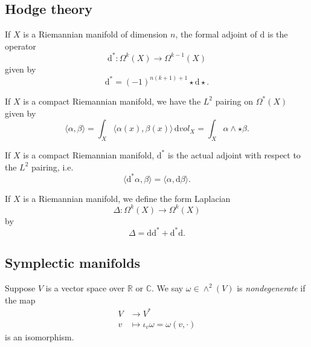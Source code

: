 \documentclass[12pt,letterpaper,reqno]{article}
\numberwithin{equation}{section}
\newcommand{\R}{\ensuremath{\mathbb R}}
\newcommand{\C}{\ensuremath{\mathbb C}}
\newcommand{\de}{\mathrm{d}}
\newcommand{\IP}[1]{\langle#1\rangle}
\newcommand{\ti}[1]{\textit{#1}}
\newcommand{\fixme}[1]{{\color{orange}{[#1]}}}
\begin{document}
\subsection{Hodge theory}

\begin{defn}[Formal adjoint of $\de$]
If $X$ is a Riemannian manifold of dimension $n$,
the formal adjoint of $\de$
is the operator
\begin{equation}
  \de^*: \Omega^{k}(X) \to \Omega^{k-1}(X)
\end{equation}
given by
\begin{equation}
  \de^* = (-1)^{n(k+1)+1} \star \de \star.
\end{equation}
\end{defn}

If $X$ is a compact Riemannian manifold, we have
the $L^2$ pairing on $\Omega^*(X)$ given by
\begin{equation}
  \IP{\alpha,\beta} = \int_X \IP{\alpha(x),\beta(x)} \, \de vol_X = \int_X \alpha \wedge \star \beta.
\end{equation}

\begin{lem}
If $X$ is a compact Riemannian manifold, $\de^*$ is the actual adjoint
with respect to the $L^2$ pairing, i.e.
\begin{equation}
  \IP{\de^* \alpha,\beta} = \IP{\alpha,\de \beta}.
\end{equation}
\end{lem}

\begin{defn}
If $X$ is a Riemannian manifold, we define the form Laplacian
\begin{equation}
  \Delta: \Omega^k(X) \to \Omega^k(X)
\end{equation}
by
\begin{equation} \label{eq:form-laplacian}
  \Delta = \de \de^* + \de^* \de.
\end{equation}
\end{defn}
\fixme{...}


\subsection{Symplectic manifolds}

\begin{defn} \label{def:nondegenerate-skew-pairing}
Suppose $V$ is a vector space over $\R$ or $\C$.
We say $\omega \in \wedge^2(V)$ is \ti{nondegenerate}
if the map
\begin{align}
  V &\to V^* \\
  v &\mapsto \iota_v \omega = \omega(v,\cdot)
\end{align}
is an isomorphism.
\end{defn}
\end{document}
